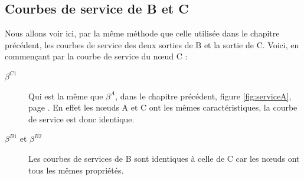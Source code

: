 \subsection{Courbes de service de B et C}\label{sub:courbesServiceB-C}
Nous allons voir ici, par la même méthode que celle utilisée dans le chapitre précédent, les courbes de service des deux sorties de B et la sortie de C. Voici, en commençant par la courbe de service du n\oe ud C :
\begin{description}
\item[$\beta^{C1}$] Qui est la même que $\beta^A$, dans le chapitre précédent, figure \ref{fig:serviceA}, page \pageref{fig:serviceA}. En effet les n\oe uds A et C ont les mêmes caractéristiques, la courbe de service est donc identique.
\item[$\beta^{B1}$ et $\beta^{B2}$] Les courbes de services de B sont identiques à celle de C car les n\oe uds ont tous les mêmes propriétés. 
\end{description}

